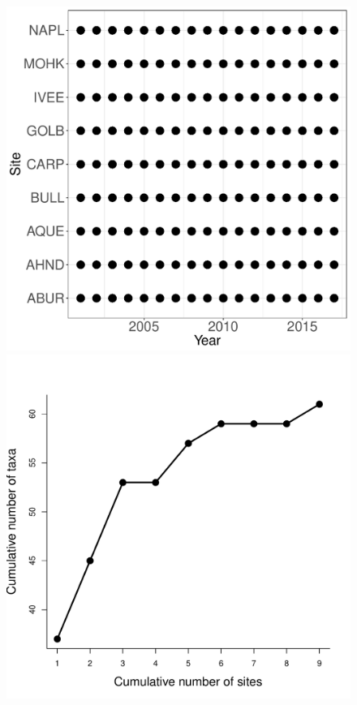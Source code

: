 \documentclass[11pt, oneside]{article}
\begin{document}
\begin{figure}[h!]
\includegraphics[scale = 0.4]{sbc-fish-castorani_spatiotemporal_sampling_effort.pdf}
\includegraphics[scale = 0.4]{sbc-fish-castorani_species_accumulation_space.pdf}

\end{figure}
\end{document}

